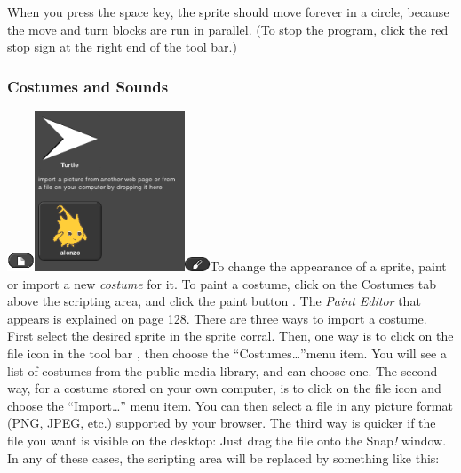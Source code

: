When you press the space key, the sprite should move forever in a
circle, because the move and turn blocks are run in parallel. (To stop
the program, click the red stop sign at the right end of the tool bar.)

\subsubsection{Costumes and Sounds}\label{costumes-and-sounds}

\includegraphics[width=0.31944in,height=0.21528in]{media/image30.png}\includegraphics[width=1.76667in,height=1.875in]{media/image31.png}\includegraphics[width=0.29167in,height=0.16667in]{media/image32.png}To
change the appearance of a sprite, paint or import a new \emph{costume}
for it. To paint a costume, click on the Costumes tab above the
scripting area, and click the paint button . The \emph{Paint Editor}
that appears is explained on page \hyperref[the-paint-editor]{128}.
There are three ways to import a costume. First select the desired
sprite in the sprite corral. Then, one way is to click on the file icon
in the tool bar , then choose the ``Costumes\ldots''menu item. You will
see a list of costumes from the public media library, and can choose
one. The second way, for a costume stored on your own computer, is to
click on the file icon and choose the ``Import\ldots'' menu item. You
can then select a file in any picture format (PNG, JPEG, etc.) supported
by your browser. The third way is quicker if the file you want is
visible on the desktop: Just drag the file onto the Snap\emph{!} window.
In any of these cases, the scripting area will be replaced by something
like this:

